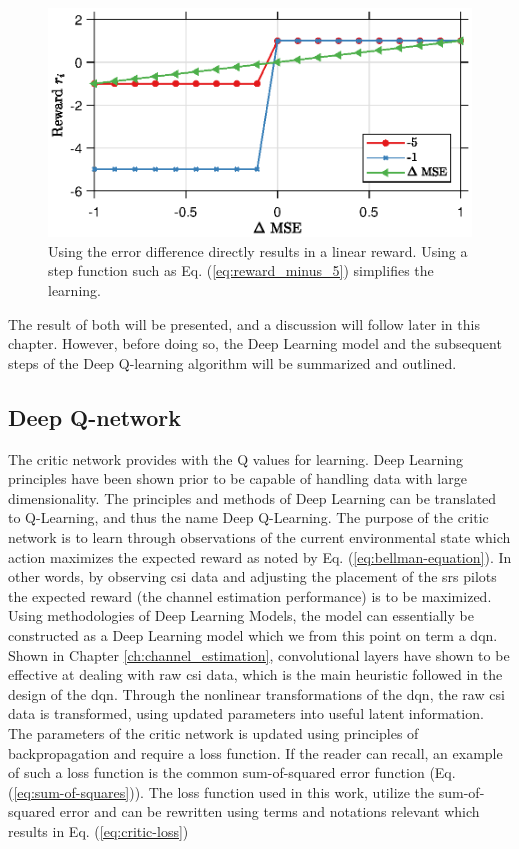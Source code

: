 \begin{figure}
    \centering
    \includegraphics{chapters/part_uplink/figures/reward_example_figure.eps}
    \caption{Using the error difference directly results in a linear reward. Using a step function such as Eq. (\ref{eq:reward_minus_5}) simplifies the learning.}
    \label{fig:reward_example_figure}
\end{figure}

The result of both will be presented, and a discussion will follow later in this chapter. However, before doing so, the Deep Learning model and the subsequent steps of the Deep Q-learning algorithm will be summarized and outlined.

\subsection{Deep Q-network}

The critic network provides with the Q values for learning. Deep Learning principles have been shown prior to be capable of handling data with large dimensionality. The principles and methods of Deep Learning can be translated to Q-Learning, and thus the name Deep Q-Learning. The purpose of the critic network is to learn through observations of the current environmental state which action maximizes the expected reward as noted by Eq. (\ref{eq:bellman-equation}). In other words, by observing \gls{csi} data and adjusting the placement of the \gls{srs} pilots the expected reward (the channel estimation performance) is to be maximized. Using methodologies of Deep Learning Models, the model can essentially be constructed as a Deep Learning model which we from this point on term a \gls{dqn}. Shown in Chapter \ref{ch:channel_estimation}, convolutional layers have shown to be effective at dealing with raw \gls{csi} data, which is the main heuristic followed in the design of the \gls{dqn}. Through the nonlinear transformations of the \gls{dqn}, the raw \gls{csi} data is transformed, using updated parameters into useful latent information. The parameters of the critic network is updated using principles of backpropagation and require a loss function. If the reader can recall, an example of such a loss function is the common sum-of-squared error function (Eq. (\ref{eq:sum-of-squares})). The loss function used in this work, utilize the sum-of-squared error and can be rewritten using terms and notations relevant which results in Eq. (\ref{eq:critic-loss})

